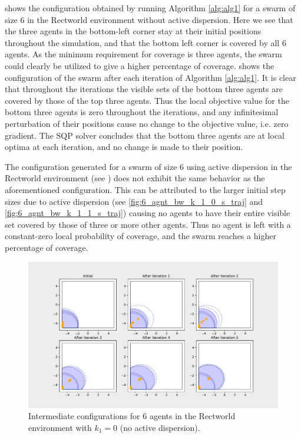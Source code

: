  shows the configuration obtained
by running Algorithm \ref{alg:alg1} for a swarm of size 6 in the Rectworld environment  without active dispersion. Here we see that the three agents in the bottom-left corner stay
at their initial positions throughout the simulation, and that the bottom left corner is covered by all 6 agents. As the minimum requirement for coverage is three agents, the swarm could 
clearly be utilized to give a higher percentage of coverage.  shows the configuration of the swarm after each iteration of Algorithm \ref{alg:alg1}. It is clear that 
throughout the iterations the visible sets of the bottom three agents are covered by those of the top three agents. Thus the local objective value for the bottom three agents is zero 
throughout the iterations, and any infinitesimal perturbation of their positions cause no change to the objective value, i.e. zero gradient. The SQP solver concludes that the bottom three agents are at local
optima at each iteration, and no change is made to their position. 

The configuration generated for a swarm of size 6 using active dispersion in the Rectworld environment (see ) does not exhibit the same behavior as the aforementioned configuration. This can be attributed to the
larger initial step sizes due to active dispersion (see \ref{fig:6_agnt_bw_k_1_0_s_traj} and \ref{fig:6_agnt_bw_k_1_1_s_traj}) causing no agents to have their entire visible set covered by those of three or more other agents.
Thus no agent is left with a constant-zero local probability of coverage, and the swarm reaches a higher percentage of coverage.

\begin{figure}[H]
  \centering
  \includegraphics[width=\textwidth]{figs/bigworld_6_agnt_k_1_0_k_2_1_x_traj.pdf}
  \caption{Intermediate configurations for 6 agents in the Rectworld environment with $k_{1} = 0$ (no active dispersion).}
  \label{fig:bw_x_traj}
\end{figure}

